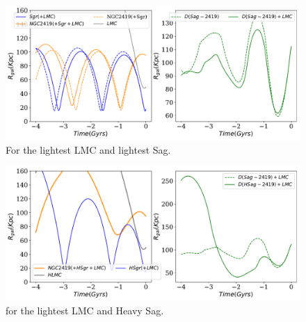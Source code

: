 \documentclass[14pt]{article}
\begin{document}
\begin{figure}[H]
\centering
\includegraphics[scale=0.5]{../exploratory_code/NGC2419_sphMWSGRLMC.pdf}
\caption{For the lightest LMC and lightest Sag.}
\end{figure}


\begin{figure}[H]
\centering
\includegraphics[scale=0.5]{../exploratory_code/NGC2419_sphMWHSGRLMC.pdf}
\caption{for the lightest LMC and Heavy Sag.}
\end{figure}
\end{document}
